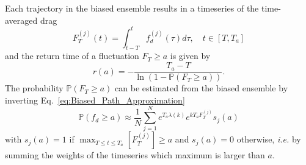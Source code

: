 \documentclass{jfm}
\begin{document}
Each trajectory in the biased ensemble results in a timeseries of the time-averaged drag
\begin{equation}
\label{eq:time_averaged}
F_T^{(j)}(t) = \int_{t-T}^{t}f_d^{(j)}(\tau)d\tau, \quad t\in [T,T_a]  
\end{equation}
and the return time of a fluctuation $F_T \geq a$ is given by~\citep{lestang_computing_2018}
\begin{equation}
r(a) = - \frac{T_a - T}{\ln (1-\mathbb{P}(F_T \geq a))}.
\end{equation}
%
The probability $\mathbb{P}(F_T \geq a)$ can be estimated from the biased ensemble by inverting Eq.~\eqref{eq:Biased_Path_Approximation}
\begin{equation}
\mathbb{P}(f_d \geq a) \approx \frac{1}{N}\sum_{j=1}^{N}e^{T_a \lambda(k)}e^{k T_a  F_T^{(j)}}s_j(a)
\end{equation}
with $s_j(a) = 1$ if $\max_{T\leq t \leq T_a}[F_T^{(j)}] \geq a$ and $s_j(a) = 0$ otherwise, \emph{i.e.} by summing the weights of the timeseries which maximum is larger than $a$.
\end{document}
